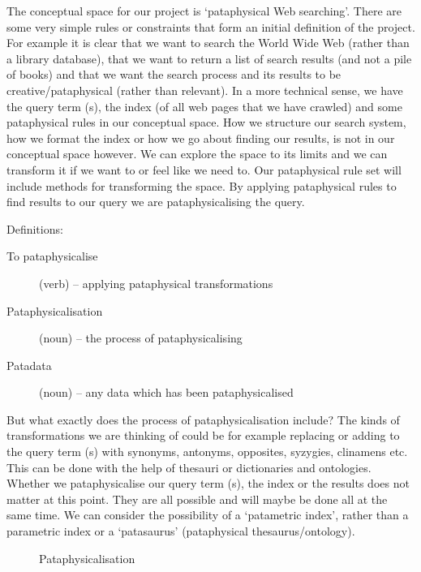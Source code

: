 The conceptual space for our project is `pataphysical Web searching'. There are some very simple rules or constraints that form an initial definition of the project. For example it is clear that we want to search the World Wide Web (rather than a library database), that we want to return a list of search results (and not a pile of books) and that we want the search process and its results to be creative/pataphysical (rather than relevant).  In a more technical sense, we have the query term (s), the index (of all web pages that we have crawled) and some pataphysical rules in our conceptual space. How we structure our search system, how we format the index or how we go about finding our results, is not in our conceptual space however. We can explore the space to its limits and we can transform it if we want to or feel like we need to. Our pataphysical rule set will include methods for transforming the space. By applying pataphysical rules to find results to our query we are pataphysicalising the query.

Definitions:
\begin{description}
  \item [To pataphysicalise] (verb) – applying pataphysical transformations
  \item [Pataphysicalisation] (noun) – the process of pataphysicalising
  \item [Patadata] (noun) – any data which has been pataphysicalised
\end{description}

But what exactly does the process of pataphysicalisation include? The kinds of transformations we are thinking of could be for example replacing or adding to the query term (s) with synonyms, antonyms, opposites, syzygies, clinamens etc. This can be done with the help of thesauri or dictionaries and ontologies. Whether we pataphysicalise our query term (s), the index or the results does not matter at this point. They are all possible and will maybe be done all at the same time. We can consider the possibility of a `patametric index', rather than a parametric index or a `patasaurus' (pataphysical thesaurus/ontology).

\begin{figure}[htb] %
  \centering
  \def\svgwidth{\columnwidth}
  
\caption[Pataphysicalisation]{Pataphysicalisation}
\label{fig:patasearch02f}
\end{figure}

